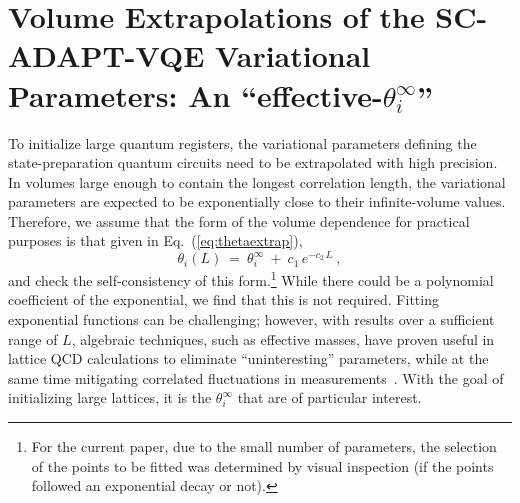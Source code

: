 \documentclass[aps, pra, onecolumn, tightenlines, letterpaper, amsmath, amssymb, preprintnumbers, floatfix, longbibliography, nofootinbib]{revtex4-2}
\begin{document}
\clearpage
\section{Volume Extrapolations of the SC-ADAPT-VQE Variational Parameters: 
An ``effective-\texorpdfstring{$\theta_i^{\infty}$}{theta infinity}''}
\label{app:ThetaScaling}
\noindent
To initialize large quantum registers, the variational parameters defining the state-preparation quantum circuits need to be extrapolated with high precision. 
In volumes large enough to contain the longest correlation length, 
the variational parameters are expected to be exponentially close to their infinite-volume values.
Therefore, we assume that the form of the volume dependence for practical purposes is that given in Eq.~(\ref{eq:thetaextrap}),
%
\begin{equation}
\theta_i(L) \ = \ \theta_i^{\infty} \ + \  c_1\,e^{-c_2 \, L} 
\ ,
\label{eq:thetaextrapAPP}
\end{equation}
%
and check the self-consistency of this form.\footnote{For the current paper, due to the small number of parameters, the selection of the points to be fitted was determined by visual inspection (if the points followed an exponential decay or not).}
While there could be a polynomial coefficient of the exponential, 
we find that this is not required.
Fitting exponential functions can be challenging; 
however, with results over a sufficient range of $L$, algebraic techniques, such as effective masses, have proven useful in lattice QCD calculations to eliminate ``uninteresting'' parameters, while at the same time mitigating correlated fluctuations in measurements~\cite{Michael:1985ne,Luscher:1990ck,DeGrand1990FromAT,Fleming:2004hs,Beane:2009kya}.
With the goal of initializing large lattices, it is the
$\theta_i^{\infty}$ that are of particular interest.
\end{document}
